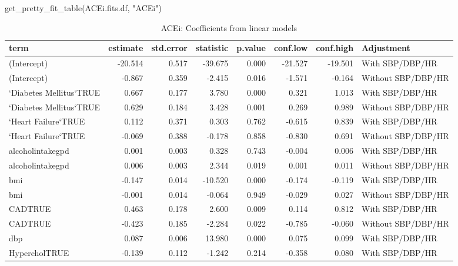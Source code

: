 \documentclass[
]{article}
\newenvironment{Shaded}{\begin{snugshade}}{\end{snugshade}}
\newcommand{\FunctionTok}[1]{\textcolor[rgb]{0.00,0.00,0.00}{#1}}
\newcommand{\NormalTok}[1]{#1}
\newcommand{\StringTok}[1]{\textcolor[rgb]{0.31,0.60,0.02}{#1}}
\begin{document}
\begin{Shaded}
\begin{Highlighting}[]
\FunctionTok{get\_pretty\_fit\_table}\NormalTok{(ACEi.fits.df, }\StringTok{"ACEi"}\NormalTok{)}
\end{Highlighting}
\end{Shaded}

\begin{table}

\caption{\label{tab:ACEi-fit-table}ACEi: Coefficients from linear models}
\centering
\begin{tabular}[t]{l|r|r|r|r|r|r|l}
\hline
term & estimate & std.error & statistic & p.value & conf.low & conf.high & Adjustment\\
\hline
(Intercept) & -20.514 & 0.517 & -39.675 & 0.000 & -21.527 & -19.501 & With SBP/DBP/HR\\
\hline
(Intercept) & -0.867 & 0.359 & -2.415 & 0.016 & -1.571 & -0.164 & Without SBP/DBP/HR\\
\hline
`Diabetes Mellitus`TRUE & 0.667 & 0.177 & 3.780 & 0.000 & 0.321 & 1.013 & With SBP/DBP/HR\\
\hline
`Diabetes Mellitus`TRUE & 0.629 & 0.184 & 3.428 & 0.001 & 0.269 & 0.989 & Without SBP/DBP/HR\\
\hline
`Heart Failure`TRUE & 0.112 & 0.371 & 0.303 & 0.762 & -0.615 & 0.839 & With SBP/DBP/HR\\
\hline
`Heart Failure`TRUE & -0.069 & 0.388 & -0.178 & 0.858 & -0.830 & 0.691 & Without SBP/DBP/HR\\
\hline
alcoholintakegpd & 0.001 & 0.003 & 0.328 & 0.743 & -0.004 & 0.006 & With SBP/DBP/HR\\
\hline
alcoholintakegpd & 0.006 & 0.003 & 2.344 & 0.019 & 0.001 & 0.011 & Without SBP/DBP/HR\\
\hline
bmi & -0.147 & 0.014 & -10.520 & 0.000 & -0.174 & -0.119 & With SBP/DBP/HR\\
\hline
bmi & -0.001 & 0.014 & -0.064 & 0.949 & -0.029 & 0.027 & Without SBP/DBP/HR\\
\hline
CADTRUE & 0.463 & 0.178 & 2.600 & 0.009 & 0.114 & 0.812 & With SBP/DBP/HR\\
\hline
CADTRUE & -0.423 & 0.185 & -2.284 & 0.022 & -0.785 & -0.060 & Without SBP/DBP/HR\\
\hline
dbp & 0.087 & 0.006 & 13.980 & 0.000 & 0.075 & 0.099 & With SBP/DBP/HR\\
\hline
HypercholTRUE & -0.139 & 0.112 & -1.242 & 0.214 & -0.358 & 0.080 & With SBP/DBP/HR\\

\end{tabular}
\end{table}
\end{document}
